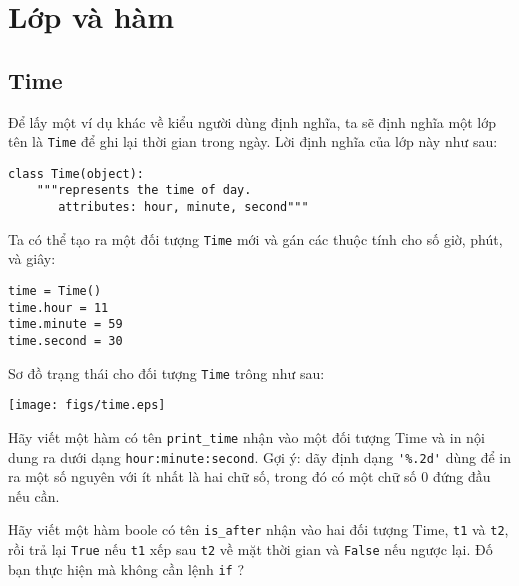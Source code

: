 \documentclass[11pt]{book}
\begin{document}
\chapter{Lớp và hàm}
\label{time}


\section{Time}

Để lấy một ví dụ khác về kiểu người dùng định nghĩa, ta sẽ định nghĩa
một lớp tên là {\tt Time} để ghi lại thời gian trong ngày. Lời định nghĩa của
lớp này như sau:


\beforeverb
\begin{verbatim}
class Time(object):
    """represents the time of day.
       attributes: hour, minute, second"""
\end{verbatim}
\afterverb
%
Ta có thể tạo ra một đối tượng {\tt Time} mới và gán các 
thuộc tính cho số giờ, phút, và giây:

\beforeverb
\begin{verbatim}
time = Time()
time.hour = 11
time.minute = 59
time.second = 30
\end{verbatim}
\afterverb
%
Sơ đồ trạng thái cho đối tượng {\tt Time} trông như sau:


\beforefig
\centerline{\texttt{[image: figs/time.eps]}}
\afterfig

\begin{ex}
\label{printtime}
Hãy viết một hàm có tên \verb"print_time" nhận vào một đối tượng
Time và in nội dung ra dưới dạng {\tt hour:minute:second}.
Gợi ý: dãy định dạng \verb"'%.2d'" dùng để in ra một số nguyên
với ít nhất là hai chữ số, trong đó có một chữ số 0 đứng đầu nếu cần.
\end{ex}

\begin{ex}
\label{is_after}


Hãy viết một hàm boole có tên \verb"is_after" nhận vào
hai đối tượng Time, {\tt t1} và {\tt t2}, rồi trả lại
{\tt True} nếu {\tt t1} xếp sau {\tt t2} về mặt thời gian và
{\tt False} nếu ngược lại.  Đố bạn thực hiện mà không cần lệnh {\tt if} ?
\end{ex}
\end{document}
